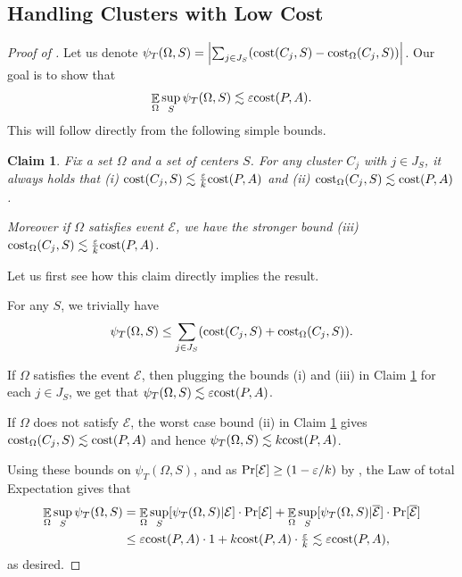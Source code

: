 \documentclass[11pt]{article}
\newtheorem{claim}[lemma]{Claim}
\theoremstyle{restate}
\theoremstyle{definition}
\newcommand{\eps}{\ensuremath{\varepsilon}}
\DeclareMathOperator*{\Prob}{\ensuremath{\textnormal{Pr}}}
\renewcommand{\Pr}{\Prob}
\newcommand{\E}{\mathop{\mathbb{E}}}
\newcommand{\cost}{\textnormal{cost}}
\newcommand{\costom}{\cost_\Omega} %
\begin{document}
\subsection{Handling Clusters with Low Cost}\label{app: tiny-cluster}
\begin{proof}[Proof of ]
Let us denote $\psi_T(\Omega, S) = \left\lvert \sum_{j \in J_S}(\cost(C_j, S) - \costom(C_j,S))\right\rvert$.  
Our goal is to show that
\[\E_{\Omega} \sup_{S} \psi_T(\Omega, S) \lesssim \eps \cost(P,A).\]
This will follow directly from the following simple bounds. 
\begin{claim}\label{clm: useful-tiny}
    Fix a set $\Omega$ and a set of centers $S$. For any cluster $C_j$ with $j \in J_S$, it always holds that (i)   $\cost(C_j, S) \lesssim \tfrac{\eps}{k} \cost(P,A)$  and (ii)  $\costom(C_j, S) \lesssim  \cost(P,A)$.
  
    Moreover if $\Omega$ satisfies event $\mathcal{E}$, we have the stronger bound (iii)  $\costom(C_j, S) \lesssim \tfrac{\eps}{k} \cost(P,A)$.
\end{claim}

Let us first see how this claim directly implies the result.

For any $S$, we trivially have
\[\psi_T(\Omega, S) \leq \sum_{j \in J_S}(\cost(C_j, S) + \costom(C_j, S)). \]

If $\Omega$ satisfies the event $\mathcal{E}$, then plugging the bounds (i) and (iii) in Claim \ref{clm: useful-tiny} for each $j\in J_S$, we get that $\psi_T(\Omega, S)\lesssim \eps \cost(P,A)$.

If $\Omega$ does not satisfy $\mathcal{E}$, the worst case bound (ii) in Claim \ref{clm: useful-tiny} gives $\costom(C_j, S) \lesssim \cost(P,A)$ and hence $\psi_T(\Omega, S)\lesssim k \cost(P,A)$. 


Using these bounds on $\psi_T(\Omega, S)$, and as $\Pr[\mathcal{E}] \geq (1 - \eps/k)$  by , the Law of total Expectation gives that 
\begin{align*}
\E_{\Omega} \sup_{S} \psi_T(\Omega, S) &= \E_{\Omega} \sup_{S} [\psi_T(\Omega, S)| \mathcal{E}] \cdot \Pr[\mathcal{E}] + \E_{\Omega} \sup_{S}[\psi_T(\Omega, S)| \overline{\mathcal{E}}] \cdot \Pr[\overline{\mathcal{E}}] 
\\
&\leq \eps \cost(P,A) \cdot 1 + k\cost(P,A) \cdot \tfrac{\eps}{k} \lesssim \eps \cost(P,A),
\end{align*}
as desired.


\end{proof}
\end{document}
